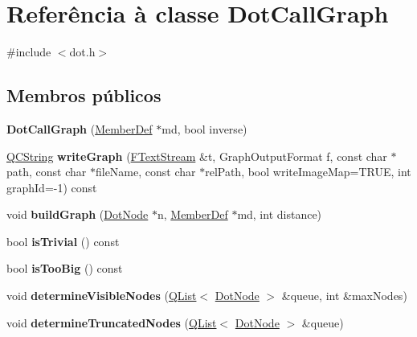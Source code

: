 \hypertarget{class_dot_call_graph}{\section{Referência à classe Dot\-Call\-Graph}
\label{class_dot_call_graph}
}


{\ttfamily \#include $<$dot.\-h$>$}

\subsection*{Membros públicos}
\begin{DoxyCompactItemize}
\item 
\hypertarget{class_dot_call_graph_addda538e29290fcdd48d03a949313976}{{\bfseries Dot\-Call\-Graph} (\hyperlink{class_member_def}{Member\-Def} $\ast$md, bool inverse)}\label{class_dot_call_graph_addda538e29290fcdd48d03a949313976}

\item 
\hypertarget{class_dot_call_graph_af0f58a9e435e7e0e753813e6e40018e6}{\hyperlink{class_q_c_string}{Q\-C\-String} {\bfseries write\-Graph} (\hyperlink{class_f_text_stream}{F\-Text\-Stream} \&t, Graph\-Output\-Format f, const char $\ast$path, const char $\ast$file\-Name, const char $\ast$rel\-Path, bool write\-Image\-Map=T\-R\-U\-E, int graph\-Id=-\/1) const }\label{class_dot_call_graph_af0f58a9e435e7e0e753813e6e40018e6}

\item 
\hypertarget{class_dot_call_graph_af5d32ca8ecafb68b247ef4e57752094d}{void {\bfseries build\-Graph} (\hyperlink{class_dot_node}{Dot\-Node} $\ast$n, \hyperlink{class_member_def}{Member\-Def} $\ast$md, int distance)}\label{class_dot_call_graph_af5d32ca8ecafb68b247ef4e57752094d}

\item 
\hypertarget{class_dot_call_graph_a3359ce63bc7239a94a35485704af1993}{bool {\bfseries is\-Trivial} () const }\label{class_dot_call_graph_a3359ce63bc7239a94a35485704af1993}

\item 
\hypertarget{class_dot_call_graph_a5867a12e614d417ec919a945ffa92cb1}{bool {\bfseries is\-Too\-Big} () const }\label{class_dot_call_graph_a5867a12e614d417ec919a945ffa92cb1}

\item 
\hypertarget{class_dot_call_graph_a666c1654548768635077efd9c692b7ae}{void {\bfseries determine\-Visible\-Nodes} (\hyperlink{class_q_list}{Q\-List}$<$ \hyperlink{class_dot_node}{Dot\-Node} $>$ \&queue, int \&max\-Nodes)}\label{class_dot_call_graph_a666c1654548768635077efd9c692b7ae}

\item 
\hypertarget{class_dot_call_graph_a815120386942a141454a1fec30d2d546}{void {\bfseries determine\-Truncated\-Nodes} (\hyperlink{class_q_list}{Q\-List}$<$ \hyperlink{class_dot_node}{Dot\-Node} $>$ \&queue)}\label{class_dot_call_graph_a815120386942a141454a1fec30d2d546}

\end{DoxyCompactItemize}


